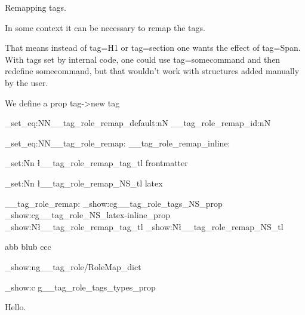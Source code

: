 \documentclass{article}
\begin{document}
Remapping tags. 

In some context it can be necessary to remap the tags. 

That means instead of tag=H1 or tag=section one wants the effect of tag=Span.
With tags set by internal code, one could use tag=somecommand and then redefine somecommand,
but that wouldn't work with structures added manually by the user. 

We define a prop tag->new tag

\ExplSyntaxOn
% 

\cs_set_eq:NN\__tag_role_remap_default:nN \__tag_role_remap_id:nN
 
\cs_set_eq:NN\__tag_role_remap: \__tag_role_remap_inline: 

\tl_set:Nn \l__tag_role_remap_tag_tl {frontmatter} 

\tl_set:Nn \l__tag_role_remap_NS_tl {latex} 

\__tag_role_remap:
\prop_show:c{g__tag_role_tags_NS_prop}
\prop_show:c{g__tag_role_NS_latex-inline_prop}
\tl_show:N\l__tag_role_remap_tag_tl
\tl_show:N\l__tag_role_remap_NS_tl

abb 
\tagmcend{}blub\tagmcend\tagstructend{} 
ccc 

\pdfdict_show:n{g__tag_role/RoleMap_dict}
 
\prop_show:c {g__tag_role_tags_types_prop} 
\ExplSyntaxOff

 

Hello.
\end{document}

